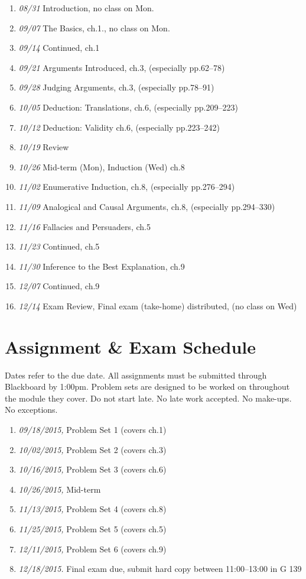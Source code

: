 \documentclass[article,oneside]{memoir}
\begin{document}
\begin{enumerate}
\item \textit{08/31} Introduction,  no class on Mon.
\item \textit{09/07} The Basics,  ch.1., no class on Mon.
\item \textit{09/14} Continued, ch.1 
\item \textit{09/21} Arguments Introduced, ch.3, (especially pp.62--78)
\item \textit{09/28} Judging Arguments, ch.3, (especially pp.78--91)
\item \textit{10/05} Deduction: Translations, ch.6, (especially pp.209--223)
\item \textit{10/12} Deduction: Validity ch.6, (especially pp.223--242)
\item \textit{10/19} Review
\item \textit{10/26} Mid-term (Mon), Induction (Wed) ch.8
\item \textit{11/02} Enumerative Induction, ch.8, (especially pp.276--294)
\item \textit{11/09} Analogical and Causal Arguments, ch.8, (especially pp.294--330)
\item \textit{11/16} Fallacies and Persuaders, ch.5
 \item \textit{11/23} Continued, ch.5
 \item \textit{11/30} Inference to the Best Explanation, ch.9
\item \textit{12/07} Continued,  ch.9
\item \textit{12/14} Exam Review, Final exam (take-home) distributed, (no class on Wed)
\end{enumerate}


\section{Assignment \& Exam Schedule}
Dates refer to the due date. All assignments must be submitted through Blackboard by 1:00pm. Problem sets are designed to be worked on throughout the module they cover. Do not start late. No late work accepted. No make-ups. No exceptions. 

\begin{enumerate}
\item \textit{09/18/2015,} Problem Set 1 (covers ch.1)
\item \textit{10/02/2015,} Problem Set 2 (covers ch.3)
\item \textit{10/16/2015,} Problem Set 3 (covers ch.6)
\item \textit{10/26/2015,} Mid-term 
\item \textit{11/13/2015,} Problem Set 4 (covers ch.8)
\item \textit{11/25/2015,} Problem Set 5 (covers ch.5)
\item \textit{12/11/2015,} Problem Set 6 (covers ch.9)
\item \textit{12/18/2015.} Final exam due, submit hard copy between 11:00--13:00 in G 139 
\end{enumerate}


\end{document}
